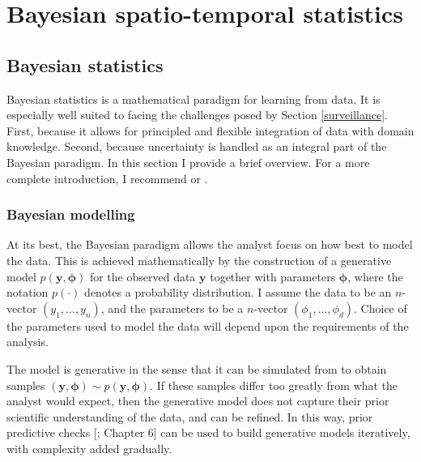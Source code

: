 \documentclass[a4paper, nobind]{templates/ociamthesis}
\begin{document}
\hypertarget{bayes-st}{%
\chapter{Bayesian spatio-temporal statistics}\label{bayes-st}}

\adjustmtc
{}

\hypertarget{bayesian-statistics}{%
\section{Bayesian statistics}\label{bayesian-statistics}}

Bayesian statistics is a mathematical paradigm for learning from data.
It is especially well suited to facing the challenges posed by Section \ref{surveillance}.
First, because it allows for principled and flexible integration of data with domain knowledge.
Second, because uncertainty is handled as an integral part of the Bayesian paradigm.
In this section I provide a brief overview.
For a more complete introduction, I recommend \textcite{gelman2013bayesian} or \textcite{mcelreath2020statistical}.

\hypertarget{bayesian-modelling}{%
\subsection{Bayesian modelling}\label{bayesian-modelling}}

At its best, the Bayesian paradigm allows the analyst focus on how best to model the data.
This is achieved mathematically by the construction of a generative model \(p(\mathbf{y}, \boldsymbol{\mathbf{\phi}})\) for the observed data \(\mathbf{y}\) together with parameters \(\boldsymbol{\mathbf{\phi}}\), where the notation \(p(\cdot)\) denotes a probability distribution.
I assume the data to be an \(n\)-vector \((y_1, \ldots, y_n)\), and the parameters to be a \(n\)-vector \((\phi_1, \ldots, \phi_d)\).
Choice of the parameters used to model the data will depend upon the requirements of the analysis.

The model is generative in the sense that it can be simulated from to obtain samples \((\mathbf{y}, \boldsymbol{\mathbf{\phi}}) \sim p(\mathbf{y}, \boldsymbol{\mathbf{\phi}})\).
If these samples differ too greatly from what the analyst would expect, then the generative model does not capture their prior scientific understanding of the data, and can be refined.
In this way, prior predictive checks {[}\textcite{gelman2013bayesian}; Chapter 6{]} can be used to build generative models iteratively, with complexity added gradually.
\end{document}
